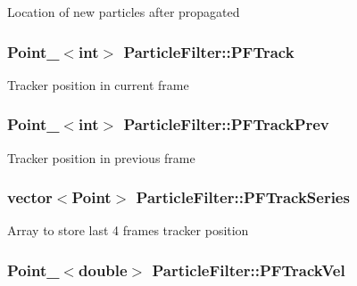 Location of new particles after propagated \hypertarget{classParticleFilter_aa86c3e9fab84151e57b81035e664fefc}{
\subsubsection[{P\-F\-Track}]{\setlength{\rightskip}{0pt plus 5cm}Point\-\_\-$<$int$>$ Particle\-Filter\-::\-P\-F\-Track\hspace{0.3cm}{\ttfamily [protected]}}}\label{classParticleFilter_aa86c3e9fab84151e57b81035e664fefc}
Tracker position in current frame \hypertarget{classParticleFilter_a1f55e5d172c164c03fb3174fb321a251}{
\subsubsection[{P\-F\-Track\-Prev}]{\setlength{\rightskip}{0pt plus 5cm}Point\-\_\-$<$int$>$ Particle\-Filter\-::\-P\-F\-Track\-Prev\hspace{0.3cm}{\ttfamily [protected]}}}\label{classParticleFilter_a1f55e5d172c164c03fb3174fb321a251}
Tracker position in previous frame \hypertarget{classParticleFilter_a4c20cd268532c1e9814c4ce1b1913d76}{
\subsubsection[{P\-F\-Track\-Series}]{\setlength{\rightskip}{0pt plus 5cm}vector$<$Point$>$ Particle\-Filter\-::\-P\-F\-Track\-Series\hspace{0.3cm}{\ttfamily [protected]}}}\label{classParticleFilter_a4c20cd268532c1e9814c4ce1b1913d76}
Array to store last 4 frames tracker position \hypertarget{classParticleFilter_a1209f1d4f8a33ea69e60cb8c021b96c2}{
\subsubsection[{P\-F\-Track\-Vel}]{\setlength{\rightskip}{0pt plus 5cm}Point\-\_\-$<$double$>$ Particle\-Filter\-::\-P\-F\-Track\-Vel\hspace{0.3cm}{\ttfamily [protected]}}}\label{classParticleFilter_a1209f1d4f8a33ea69e60cb8c021b96c2}
